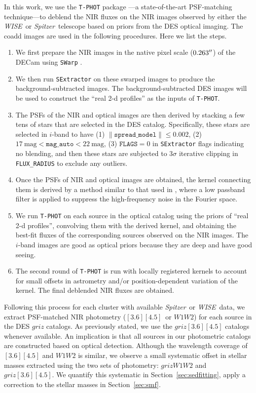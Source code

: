 \documentclass[useAMS,usenatbib,iop,numberedappendix]{mn2e}
\newcommand{\Spitzer}{\emph{Spitzer}}
\newcommand{\WISE}{\emph{WISE}}
\newcommand{\IRACone}{\ensuremath{[3.6]}}
\newcommand{\IRACtwo}{\ensuremath{[4.5]}}
\newcommand{\Wone}{\ensuremath{W1}}
\newcommand{\Wtwo}{\ensuremath{W2}}
\begin{document}
In this work, we use the \texttt{T-PHOT} package \citep{merlin15}---a state-of-the-art PSF-matching technique---to deblend the NIR fluxes on the NIR images observed by either the \WISE\ or \Spitzer\ telescope based on priors from the DES optical imaging.
The coadd images are used in the following procedures.
Here we list the steps. 
%
\begin{enumerate}
\item We first prepare the NIR images in the native pixel scale ($0.263\hbox{$^{\prime\prime}$}$) of the 
DECam using \texttt{SWarp} \citep{bertin02}.
\item We then run \texttt{SExtractor} \citep{bertin96} on these swarped images to produce the background-subtracted images. The background-subtracted DES images will be used to construct the ``real 2-d profiles'' \citep[see details in][]{merlin15} as the inputs of \texttt{T-PHOT}.
\item The PSFs of the NIR and optical images are then derived by stacking a few tens of stars that are selected in the DES catalog. Specifically, these stars are selected in $i$-band to have (1) $\|\mathtt{spread\_model}\| \leq 0.002$, (2) $17~\mathrm{mag} < \mathtt{mag\_auto} < 22~\mathrm{mag}$, (3) $\mathtt{FLAGS} = 0$ in \texttt{SExtractor} flags indicating no blending, and then these stars are subjected to 3$\sigma$ iterative clipping in \texttt{FLUX\_RADIUS} to exclude any outliers. 
\item Once the PSFs of NIR and optical images are obtained, the kernel connecting them is derived by a method similar to that used in \cite{galametz13}, where a low passband filter is applied to suppress the high-frequency noise in the Fourier space. 
\item We run \texttt{T-PHOT} on each source in the optical catalog using the priors of ``real 2-d profiles'', convolving them with the derived kernel, and obtaining the best-fit fluxes of the corresponding sources observed on the NIR images. The $i$-band images are good as optical priors because they are deep and have good seeing.
\item The second round of \texttt{T-PHOT} is run with locally registered kernels to account for small offsets in astrometry and/or position-dependent variation of the kernel. The final deblended NIR fluxes are obtained.
\end{enumerate}
%


Following this process for each cluster with available \Spitzer\ or \WISE\ data, we extract PSF-matched NIR photometry (\IRACone\IRACtwo\ or \Wone\Wtwo) for each source in the DES $griz$ catalogs.  As previously stated, we use the $griz\IRACone\IRACtwo$ catalogs whenever available.  An implication is that all sources in our photometric catalogs are constructed based on optical detection.
Although the wavelength coverage of $\IRACone\IRACtwo$ and $\Wone\Wtwo$ is similar, we observe a small systematic offset in stellar masses extracted using the two sets of photometry: $griz\Wone\Wtwo$ and $griz\IRACone\IRACtwo$. 
We quantify this systematic in Section~\ref{sec:sedfitting}, apply a correction to the stellar masses in Section~\ref{sec:smf}.\
\end{document}
